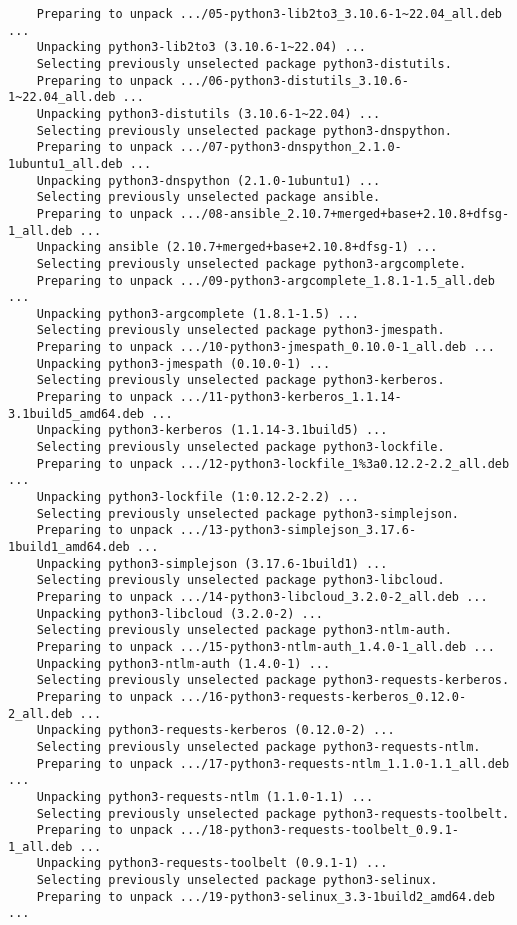 \documentclass[../main.tex]{subfiles}
\begin{document}
\begin{lstlisting}
	Preparing to unpack .../05-python3-lib2to3_3.10.6-1~22.04_all.deb ...
	Unpacking python3-lib2to3 (3.10.6-1~22.04) ...
	Selecting previously unselected package python3-distutils.
	Preparing to unpack .../06-python3-distutils_3.10.6-1~22.04_all.deb ...
	Unpacking python3-distutils (3.10.6-1~22.04) ...
	Selecting previously unselected package python3-dnspython.
	Preparing to unpack .../07-python3-dnspython_2.1.0-1ubuntu1_all.deb ...
	Unpacking python3-dnspython (2.1.0-1ubuntu1) ...
	Selecting previously unselected package ansible.
	Preparing to unpack .../08-ansible_2.10.7+merged+base+2.10.8+dfsg-1_all.deb ...
	Unpacking ansible (2.10.7+merged+base+2.10.8+dfsg-1) ...
	Selecting previously unselected package python3-argcomplete.
	Preparing to unpack .../09-python3-argcomplete_1.8.1-1.5_all.deb ...
	Unpacking python3-argcomplete (1.8.1-1.5) ...
	Selecting previously unselected package python3-jmespath.
	Preparing to unpack .../10-python3-jmespath_0.10.0-1_all.deb ...
	Unpacking python3-jmespath (0.10.0-1) ...
	Selecting previously unselected package python3-kerberos.
	Preparing to unpack .../11-python3-kerberos_1.1.14-3.1build5_amd64.deb ...
	Unpacking python3-kerberos (1.1.14-3.1build5) ...
	Selecting previously unselected package python3-lockfile.
	Preparing to unpack .../12-python3-lockfile_1%3a0.12.2-2.2_all.deb ...
	Unpacking python3-lockfile (1:0.12.2-2.2) ...
	Selecting previously unselected package python3-simplejson.
	Preparing to unpack .../13-python3-simplejson_3.17.6-1build1_amd64.deb ...
	Unpacking python3-simplejson (3.17.6-1build1) ...
	Selecting previously unselected package python3-libcloud.
	Preparing to unpack .../14-python3-libcloud_3.2.0-2_all.deb ...
	Unpacking python3-libcloud (3.2.0-2) ...
	Selecting previously unselected package python3-ntlm-auth.
	Preparing to unpack .../15-python3-ntlm-auth_1.4.0-1_all.deb ...
	Unpacking python3-ntlm-auth (1.4.0-1) ...
	Selecting previously unselected package python3-requests-kerberos.
	Preparing to unpack .../16-python3-requests-kerberos_0.12.0-2_all.deb ...
	Unpacking python3-requests-kerberos (0.12.0-2) ...
	Selecting previously unselected package python3-requests-ntlm.
	Preparing to unpack .../17-python3-requests-ntlm_1.1.0-1.1_all.deb ...
	Unpacking python3-requests-ntlm (1.1.0-1.1) ...
	Selecting previously unselected package python3-requests-toolbelt.
	Preparing to unpack .../18-python3-requests-toolbelt_0.9.1-1_all.deb ...
	Unpacking python3-requests-toolbelt (0.9.1-1) ...
	Selecting previously unselected package python3-selinux.
	Preparing to unpack .../19-python3-selinux_3.3-1build2_amd64.deb ...

\end{lstlisting}
\end{document}
